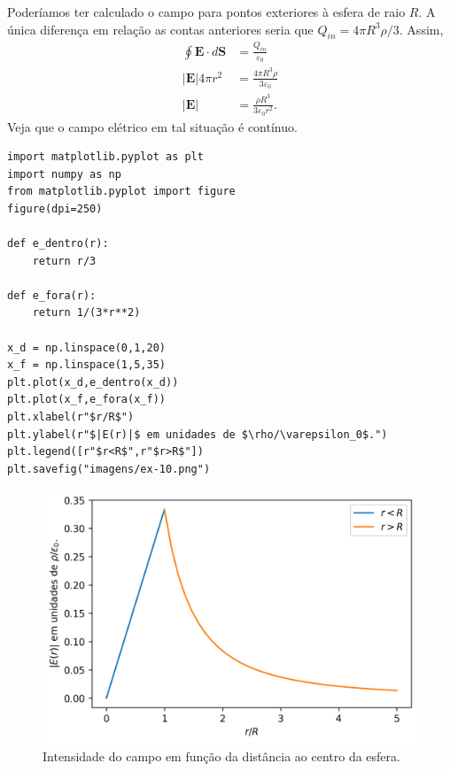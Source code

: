\documentclass[11pt]{article}
\begin{document}
Poderíamos ter calculado o campo para pontos exteriores à esfera de raio
\(R\). A única diferença em relação as contas anteriores seria que
\(Q_{in}=4\pi R^3 \rho/3\). Assim,
\begin{align*}
  \oint \mathbf E\cdot d\mathbf S &= \frac{Q_{in}}{\varepsilon_0}\\ 
  |\mathbf E| 4\pi r^2 &= \frac{4\pi R^3\rho}{3\varepsilon_0}\\
  |\mathbf E| &= \frac{\rho R^3}{3\varepsilon_0r^2}.
\end{align*}
Veja que o campo elétrico em tal situação é contínuo. 
\begin{verbatim}
import matplotlib.pyplot as plt
import numpy as np
from matplotlib.pyplot import figure
figure(dpi=250)

def e_dentro(r):
    return r/3

def e_fora(r):
    return 1/(3*r**2)

x_d = np.linspace(0,1,20)
x_f = np.linspace(1,5,35)
plt.plot(x_d,e_dentro(x_d))
plt.plot(x_f,e_fora(x_f))
plt.xlabel(r"$r/R$")
plt.ylabel(r"$|E(r)|$ em unidades de $\rho/\varepsilon_0$.")
plt.legend([r"$r<R$",r"$r>R$"])
plt.savefig("imagens/ex-10.png")
\end{verbatim}
\begin{figure}[h!]
  \centering
  \includegraphics[scale=0.8]{imagens/ex-10.png}
  \caption{Intensidade do campo em função da distância ao centro da esfera.}
\end{figure}
\end{document}
